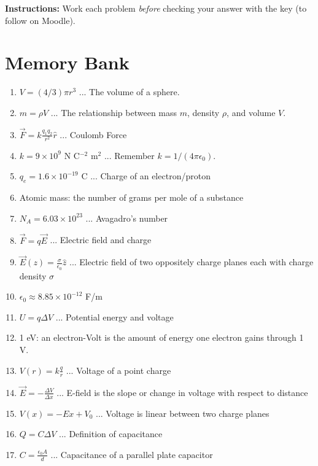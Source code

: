 \documentclass[10pt]{article}
\begin{document}
\maketitle

\textbf{Instructions:} Work each problem \textit{before} checking your answer with the key (to follow on Moodle). \\ \vspace{0.25cm}

\section{Memory Bank}

\begin{enumerate}
\item $V = (4/3) \pi r^3$ ... The volume of a sphere.
\item $m = \rho V$ ... The relationship between mass $m$, density $\rho$, and volume $V$.
\item $\vec{F} = k \frac{q_1 q_2}{r^2}\hat{r}$ ... Coulomb Force
\item $k = 9 \times 10^{9}$ N C$^{-2}$ m$^{2}$ ... Remember $k = 1/(4\pi \epsilon_0)$.
\item $q_e = 1.6 \times 10^{-19}$ C ... Charge of an electron/proton
\item Atomic mass: the number of grams per mole of a substance
\item $N_A = 6.03 \times 10^{23}$ ... Avagadro's number
\item $\vec{F} = q \vec{E}$ ... Electric field and charge
\item $\vec{E}(z) = \frac{\sigma}{\epsilon_0}\hat{z}$ ... Electric field of two oppositely charge planes each with charge density $\sigma$
\item $\epsilon_0 \approx 8.85 \times 10^{-12}$ F/m
\item $U = q\Delta V$ ... Potential energy and voltage
\item 1 eV: an electron-Volt is the amount of energy one electron gains through 1 V.
\item $V(r) = k\frac{q}{r}$ ... Voltage of a point charge
\item $\vec{E} = -\frac{\Delta V}{\Delta x}$ ... E-field is the slope or change in voltage with respect to distance
\item $V(x) = -E x + V_0$ ... Voltage is linear between two charge planes
\item $Q = C\Delta V$ ... Definition of capacitance
\item $C = \frac{\epsilon_0 A}{d}$ ... Capacitance of a parallel plate capacitor

\end{enumerate}
\end{document}
